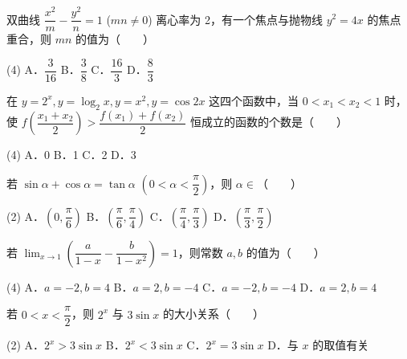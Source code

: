 \begin{question}
双曲线 $\dfrac{x^2}{m} - \dfrac{y^2}{n} = 1$ ($mn \neq 0$) 离心率为 2，有一个焦点与抛物线 $y^2 = 4x$ 的焦点重合，则 $mn$ 的值为\mbox{（　　）}

\begin{gkopts}(4)
\task A．$\dfrac{3}{16}$
\task B．$\dfrac{3}{8}$
\task C．$\dfrac{16}{3}$
\task D．$\dfrac{8}{3}$
\end{gkopts}

\end{question}
\begin{question}
在 $y = 2^x, y = \log_2 x, y = x^2, y = \cos 2x$ 这四个函数中，当 $0 < x_1 < x_2 < 1$ 时，使 $f\left(\dfrac{x_1 + x_2}{2}\right) > \dfrac{f(x_1) + f(x_2)}{2}$ 恒成立的函数的个数是\mbox{（　　）}

\begin{gkopts}(4)
\task A．0
\task B．1
\task C．2
\task D．3
\end{gkopts}

\end{question}
\begin{question}
若 $\sin\alpha + \cos\alpha = \tan\alpha$ $\left(0 < \alpha < \dfrac{\pi}{2}\right)$，则 $\alpha \in$\mbox{（　　）}

\begin{gkopts}(2)
\task A．$\left(0, \dfrac{\pi}{6}\right)$
\task B．$\left(\dfrac{\pi}{6}, \dfrac{\pi}{4}\right)$
\task C．$\left(\dfrac{\pi}{4}, \dfrac{\pi}{3}\right)$
\task D．$\left(\dfrac{\pi}{3}, \dfrac{\pi}{2}\right)$
\end{gkopts}

\end{question}
\begin{question}
若 $\lim_{x\to 1} \left(\dfrac{a}{1 - x} - \dfrac{b}{1 - x^2}\right) = 1$，则常数 $a, b$ 的值为\mbox{（　　）}

\begin{gkopts}(4)
\task A．$a = -2, b = 4$
\task B．$a = 2, b = -4$
\task C．$a = -2, b = -4$
\task D．$a = 2, b = 4$
\end{gkopts}

\end{question}
\begin{question}
若 $0 < x < \dfrac{\pi}{2}$，则 $2^x$ 与 $3\sin x$ 的大小关系\mbox{（　　）}

\begin{gkopts}(2)
\task A．$2^x > 3\sin x$
\task B．$2^x < 3\sin x$
\task C．$2^x = 3\sin x$
\task D．与 $x$ 的取值有关
\end{gkopts}

\Needspace{0.4\textheight}
\end{question}
